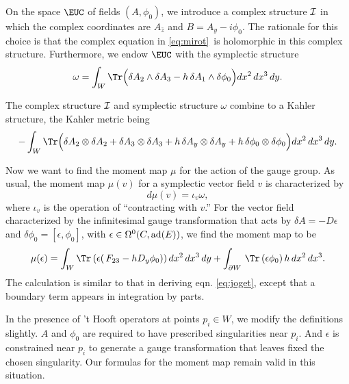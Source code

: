 On the space $\EUC$ of fields $(A,\phi_0)$, we introduce a complex
structure ${\cal I}$ in which the complex coordinates are $A_{\bar
z}$ and $B=A_y-i\phi_0$.  The rationale for this choice is that
the complex equation in \eqref{eq:mirot}\ is holomorphic in this complex
structure. Furthermore, we endow $\EUC$ with the symplectic
structure %
\setcounter{equation}{15}
\begin{equation}\label{eq:uryt}
\omega=\int_{W}\Tr\Bigl(\delta A_2\wedge
\delta A_3-h\,\delta A_1\wedge \delta\phi_0\Bigr) dx^2\,dx^3\,dy.
\end{equation}

The complex structure ${\cal I}$ and symplectic structure $\omega$
combine to a Kahler structure, the Kahler metric being
\setcounter{equation}{16}
\begin{equation}\label{eq:ryt}
-\int_W\Tr\Bigl( \delta A_2\otimes \delta A_2+\delta
A_3\otimes \delta A_3+h\,\delta A_y\otimes \delta A_y+h\,\delta
\phi_0\otimes \delta \phi_0\Bigr)dx^2\,dx^3\,dy.
\end{equation}

Now we want to find the moment map $\mu$ for the action of the
gauge group.  As usual, the moment map $\mu(v)$ for a symplectic
vector field $v$ is characterized by
\setcounter{equation}{17}
\begin{equation}\label{eq:charby}
d\mu(v)=\iota_v\omega,
\end{equation}
 where $\iota_v$ is the
operation of ``contracting with $v$.'' For the vector field
characterized by the infinitesimal gauge transformation that acts
by $\delta A=-D\epsilon$ and $\delta\phi_0 =[\epsilon,\phi_0]$,
with $\epsilon\in \Omega^0(C,{\rm ad}(E))$, we find the moment map
to be %
\setcounter{equation}{18}
\begin{equation}\label{eq:prigo}
\mu(\epsilon)=\int_W\Tr\left(\epsilon(
\,F_{23}-hD_y\phi_0)\right)dx^2\,dx^3\,dy+ \int_{\partial
W}\,\Tr\,(\epsilon\phi_0) \,h\,dx^2\,dx^3.
\end{equation}
 The calculation is
similar to that in deriving eqn. \eqref{eq:joget}, except that a boundary
term appears in integration by parts.

In the presence of 't Hooft operators at points $p_i\in W$, we
modify the definitions slightly.  $A$ and $\phi_0$ are required to
have prescribed singularities near  $p_i$.  And $\epsilon$ is
constrained near $p_i$ to generate a gauge transformation that
leaves fixed the chosen singularity. Our formulas for the moment
map remain valid in this situation.

